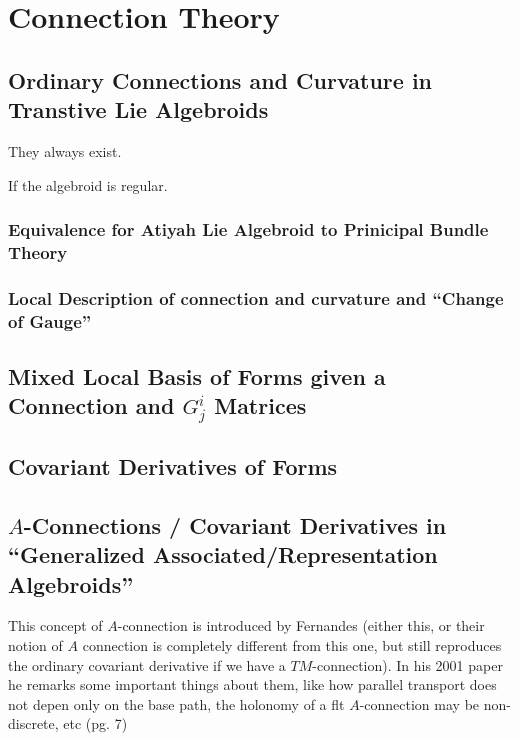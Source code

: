 \documentclass[12pt]{report}
\theoremstyle{definition}
\begin{document}
\chapter{Connection Theory}\label{chp:connections}


\section{Ordinary Connections and Curvature in Transtive Lie Algebroids}

They always exist.

If the algebroid is regular.

\subsection{Equivalence for Atiyah Lie Algebroid to Prinicipal Bundle Theory}
\subsection{Local Description of connection and curvature and ``Change of Gauge''}

\section{Mixed Local Basis of Forms given a Connection and $G^i_j$ Matrices}

\section{Covariant Derivatives of Forms}

\section{$A$-Connections / Covariant Derivatives in ``Generalized Associated/Representation Algebroids''}

This concept of $A$-connection is introduced by Fernandes (either this, or their notion of $A$ connection is completely different from this one, but still reproduces the ordinary covariant derivative if we have a $TM$-connection). In his 2001 paper he remarks some important things about them, like how parallel transport does not depen only on the base path, the holonomy of a flt $A$-connection may be non-discrete, etc (pg. 7)
\end{document}
